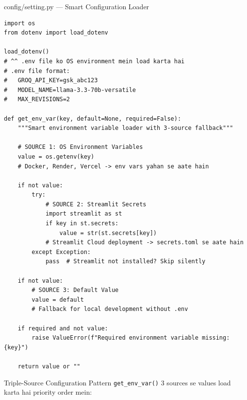 \documentclass[11pt,a4paper,twoside]{report}
\begin{document}
\begin{codewalkbox}{config/setting.py --- Smart Configuration Loader}
\begin{lstlisting}[style=pythonstyle]
import os
from dotenv import load_dotenv

load_dotenv()
# ^^ .env file ko OS environment mein load karta hai
# .env file format:
#   GROQ_API_KEY=gsk_abc123
#   MODEL_NAME=llama-3.3-70b-versatile
#   MAX_REVISIONS=2

def get_env_var(key, default=None, required=False):
    """Smart environment variable loader with 3-source fallback"""

    # SOURCE 1: OS Environment Variables
    value = os.getenv(key)
    # Docker, Render, Vercel -> env vars yahan se aate hain

    if not value:
        try:
            # SOURCE 2: Streamlit Secrets
            import streamlit as st
            if key in st.secrets:
                value = str(st.secrets[key])
            # Streamlit Cloud deployment -> secrets.toml se aate hain
        except Exception:
            pass  # Streamlit not installed? Skip silently

    if not value:
        # SOURCE 3: Default Value
        value = default
        # Fallback for local development without .env

    if required and not value:
        raise ValueError(f"Required environment variable missing: {key}")

    return value or ""
\end{lstlisting}
\end{codewalkbox}

\begin{conceptbox}{Triple-Source Configuration Pattern}
\texttt{get\_env\_var()} 3 sources se values load karta hai priority order mein:

\begin{center}
\end{center}
\end{conceptbox}
\end{document}
